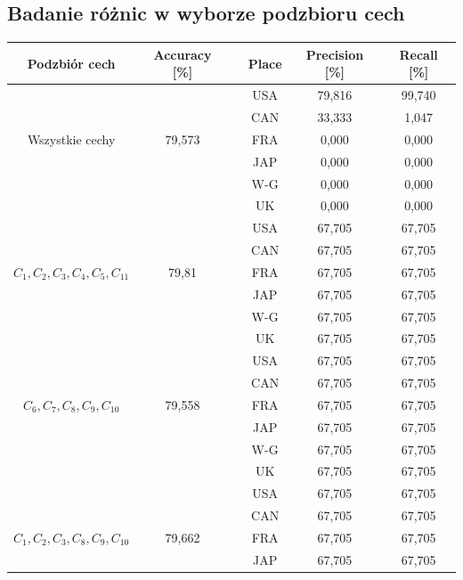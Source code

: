 \documentclass{classrep}
\begin{document}
\newpage
\subsection{Badanie różnic w wyborze podzbioru cech}
\begin{table}[h!]
	\centering
	\begin{tabular} {c c c c c c}
		\hline
		\textbf{Podzbiór cech} & \textbf{Accuracy [\%]} & \vline & \textbf{Place} & \textbf{Precision [\%]} & \textbf{Recall [\%]}\\ [0.5ex] 
		\hline
		\hline 
		&   							&\vline& USA & 79,816 & 99,740 \\
		&								&\vline& CAN & 33,333 & 1,047 \\
		Wszystkie cechy & 79,573        &\vline& FRA & 0,000 & 0,000 \\
		&								&\vline& JAP & 0,000 & 0,000 \\
		&								&\vline& W-G & 0,000 & 0,000 \\
		&		 						&\vline& UK  & 0,000 & 0,000 \\
		\hline 
		&   										 	&\vline& USA & 67,705 & 67,705 \\
		&												&\vline& CAN & 67,705 & 67,705 \\
		$C_1, C_2, C_3, C_4, C_5, C_{11}$ & 79,81       &\vline& FRA & 67,705 & 67,705 \\
		&												&\vline& JAP & 67,705 & 67,705 \\
		&												&\vline& W-G & 67,705 & 67,705 \\
		&		 										&\vline& UK  & 67,705 & 67,705 \\
		\hline 
		&   											&\vline& USA & 67,705 & 67,705 \\
		&												&\vline& CAN & 67,705 & 67,705 \\
		$C_6, C_7, C_8, C_9, C_{10}$ & 79,558        	&\vline& FRA & 67,705 & 67,705 \\
		&												&\vline& JAP & 67,705 & 67,705 \\
		&												&\vline& W-G & 67,705 & 67,705 \\
		&		 										&\vline& UK  & 67,705 & 67,705 \\
		\hline 
		&   											&\vline& USA & 67,705 & 67,705 \\
		&												&\vline& CAN & 67,705 & 67,705 \\
		$C_1, C_2, C_3, C_8, C_9, C_{10}$ & 79,662      &\vline& FRA & 67,705 & 67,705 \\
		&												&\vline& JAP & 67,705 & 67,705 \\

\end{tabular}
\end{table}
\end{document}
